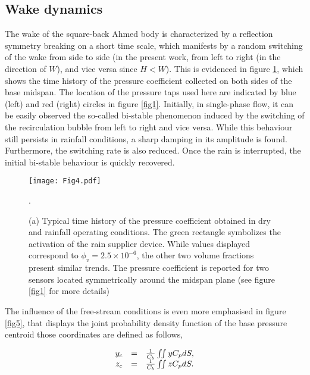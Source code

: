 \documentclass[doublecol]{epl2}
\begin{document}
\subsection{Wake dynamics}

The wake of the square-back Ahmed body is characterized by a reflection symmetry breaking on a short time scale, which manifests by a random switching of the wake from side to side (in the present work, from left to right (in the direction of $W$), and vice versa since $H<W$). This is evidenced in figure \ref{fig4}, which shows the time history of the pressure coefficient collected on both sides of the base midspan. The location of the pressure taps used here are indicated by blue (left) and red (right) circles in figure \ref{fig1}. Initially, in single-phase flow, it can be easily observed the so-called bi-stable phenomenon induced by the switching of the recirculation bubble from left to right and vice versa. While this behaviour still persists in rainfall conditions, a sharp damping in its amplitude is found. Furthermore, the switching rate is also reduced. Once the rain is interrupted, the initial bi-stable behaviour is quickly recovered. 

\begin{figure}
\centering
\texttt{[image: Fig4.pdf]}
\caption{(a) Typical time history of the pressure coefficient obtained in dry and rainfall operating conditions. The green rectangle symbolizes the activation of the rain supplier device. While values displayed correspond to $\phi_v = 2.5\times10^{-6}$, the other two volume fractions present similar trends. The pressure coefficient is reported for two sensors located symmetrically around the midspan plane (see figure \ref{fig1} for more details)}.
\label{fig4}
\end{figure}

The influence of the free-stream conditions is even more emphasised in figure \ref{fig5}, that displays the joint probability density function of the base pressure centroid those coordinates are defined as follows,

\begin{equation}
   \begin{array}{r c l}
      y_c  & = & \frac{1}{C_b} \iint y C_p dS, \\
      z_c  & = & \frac{1}{C_b} \iint z C_p dS.
   \end{array}
\end{equation}
\end{document}
